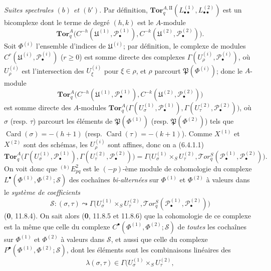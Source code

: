 \begin{env}[6.6.4]
\emph{Suites spectrales $(b)$ et $(b')$.} Par définition,
$\mathbf{Tor}_q^{A,\mathrm{II}}
(L_{\bullet\bullet}^{(1)},L_{\bullet\bullet}^{(2)})$ est un bicomplexe dont
le terme de degré $(h,k)$ est le $A$-module
\[
  \mathbf{Tor}_q^A
  \bigl(C^{-h}(\mathfrak U^{(1)},\mathscr P_\bullet^{(1)}),
        C^{-k}(\mathfrak U^{(2)},\mathscr P_\bullet^{(2)})\bigr).
\]
Soit $\Phi^{(i)}$ l'ensemble d'indices de $\mathfrak U^{(i)}$; par
définition, le complexe de modules
$C^r(\mathfrak U^{(i)},\mathscr P_\bullet^{(i)})$ ($r\geqslant0$) est somme
directe des complexes
$\Gamma(U_\rho^{(i)},\mathscr P_\bullet^{(i)})$, où $U_\rho^{(i)}$ est
l'intersection des $U_\xi^{(i)}$ pour $\xi\in\rho$, et $\rho$ parcourt
$\mathfrak P(\Phi^{(i)})$; donc le $A$-module
\[
  \mathbf{Tor}_q^A
  \bigl(C^{-h}(\mathfrak U^{(1)},\mathscr P_\bullet^{(1)}),
        C^{-k}(\mathfrak U^{(2)},\mathscr P_\bullet^{(2)})\bigr)
\]
est somme directe des $A$-modules
$\mathbf{Tor}_q^A
\bigl(\Gamma(U_\sigma^{(1)},\mathscr P_\bullet^{(1)}),
\Gamma(U_\tau^{(2)},\mathscr P_\bullet^{(2)})\bigr)$,
où $\sigma$ (resp. $\tau$) parcourt les éléments de
$\mathfrak P(\Phi^{(1)})$ (resp. $\mathfrak P(\Phi^{(2)})$) tels que
$\operatorname{Card}(\sigma)=-(h+1)$ (resp.
$\operatorname{Card}(\tau)=-(k+1)$). Comme $X^{(1)}$ et $X^{(2)}$ sont des
schémas, les $U_\rho^{(i)}$ sont affines, donc on a (6.4.1.1)
\[
  \mathbf{Tor}_q^A
  \bigl(\Gamma(U_\sigma^{(1)},\mathscr P_\bullet^{(1)}),
        \Gamma(U_\tau^{(2)},\mathscr P_\bullet^{(2)})\bigr)
  =\Gamma\bigl(U_\sigma^{(1)}\times_S U_\tau^{(2)},
    \mathscr{T}\!or_q^S
    (\mathscr P_\bullet^{(1)},\mathscr P_\bullet^{(2)})\bigr).
\]
On voit donc que ${}^{(b)}E_{pq}^2$ est le $(-p)$-ème module de
cohomologie du complexe
$L^\bullet(\Phi^{(1)},\Phi^{(2)};\mathscr S)$
des cochaînes \emph{bi-alternées} sur $\Phi^{(1)}$ et $\Phi^{(2)}$ à valeurs dans le
\emph{système de coefficients}
\[
  \mathscr S:(\sigma,\tau)\leadsto
  \Gamma\bigl(U_\sigma^{(1)}\times_S U_\tau^{(2)},
    \mathscr{T}\!or_q^S
    (\mathscr P_\bullet^{(1)},\mathscr P_\bullet^{(2)})\bigr)
\]
(\textbf{0}, 11.8.4). On sait alors (\textbf{0}, 11.8.5 et 11.8.6)
que la cohomologie de ce complexe est la même que celle du complexe
$C^\bullet(\Phi^{(1)},\Phi^{(2)};\mathscr S)$ de \emph{toutes} les cochaînes sur
$\Phi^{(1)}$ et $\Phi^{(2)}$ à valeurs dans $\mathscr S$, et aussi que celle du
complexe $P^\bullet(\Phi^{(1)},\Phi^{(2)};\mathscr S)$, dont les éléments sont
les combinaisons linéaires des
\[
  \lambda(\sigma,\tau)\in
  \Gamma\bigl(U_\sigma^{(1)}\times_S U_\tau^{(2)},
\]
\end{env}
